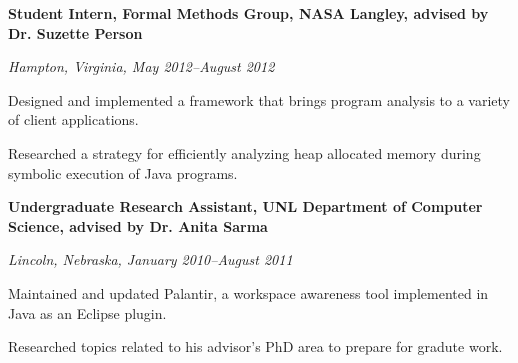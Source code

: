 \documentclass[10pt,letterpaper]{article}
\renewenvironment{itemize}{
  \begin{list}{}{
    \setlength{\leftmargin}{1.5em}
    \setlength{\itemsep}{0.25em}
    \setlength{\parskip}{0pt}
    \setlength{\parsep}{0.25em}
  }
}{
  \end{list}
}
\begin{document}
\begin{itemize}
\item \textbf{Student Intern, Formal Methods Group, NASA Langley, advised by Dr. Suzette Person}
\item \emph{Hampton, Virginia, May 2012--August 2012}
    \begin{itemize}
    \item Designed and implemented a framework that brings program analysis
    to a variety of client applications.
    \item Researched a strategy for efficiently analyzing heap allocated
    memory during symbolic execution of Java programs.
    \end{itemize}
\end{itemize}

\begin{comment}
\begin{itemize}
\item \textbf{Teaching Assistant for CSE361 (Software Engineering), August 2011--December 2011}
\item \emph{University of Nebraska-Lincoln, Department of Computer Science}
	\begin{itemize}
    \item Developed a semester project, assisted in class, graded
    assignments.
	\end{itemize}
\end{itemize}
\end{comment}

\begin{itemize}
\item \textbf{Undergraduate Research Assistant, UNL Department of Computer Science, advised by Dr. Anita Sarma}
\item \emph{Lincoln, Nebraska, January 2010--August 2011}
	\begin{itemize}
    \item Maintained and updated Palantir, a workspace awareness tool
    implemented in Java as an Eclipse plugin.
    \item Researched topics related to his advisor's PhD area to prepare for
    gradute work.
	\end{itemize}
\end{itemize}

\end{document}
